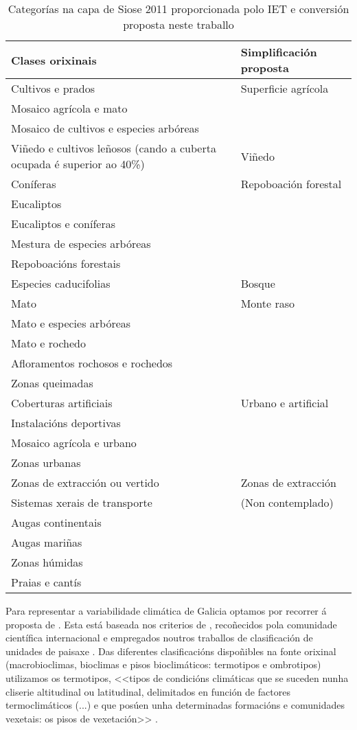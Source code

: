 \documentclass[11pt,a4paper]{article}
\begin{document}
\begin{table}
\caption{Categorías na capa de Siose 2011 proporcionada polo IET e conversión proposta neste traballo} \label{cadroSIOSE}
\begin{center}
\begin{tabular}{p{}l}
\toprule
Clases orixinais & Simplificación proposta \\
\midrule
Cultivos e prados & Superficie agrícola \\
Mosaico agrícola e mato &  \\
Mosaico de cultivos e especies arbóreas &  \\
\midrule
Viñedo e cultivos leñosos (cando a cuberta ocupada é superior ao 40\%) & Viñedo \\
\midrule
Coníferas & Repoboación forestal \\
Eucaliptos &  \\
Eucaliptos e coníferas &  \\
Mestura de especies arbóreas & \\
Repoboacións forestais &  \\
\midrule
Especies caducifolias & Bosque \\
\midrule
Mato & Monte raso\\
Mato e especies arbóreas &  \\
Mato e rochedo &  \\
Afloramentos rochosos e rochedos &  \\
Zonas queimadas &  \\
\midrule
Coberturas artificiais & Urbano e artificial \\
Instalacións deportivas &  \\
Mosaico agrícola e urbano &  \\
Zonas urbanas &  \\
\midrule
Zonas de extracción ou vertido &  Zonas de extracción\\
\midrule
Sistemas xerais de transporte &  (Non contemplado)\\
Augas continentais &  \\
Augas mariñas &  \\
Zonas húmidas &  \\
Praias e cantís &  \\
\bottomrule
\end{tabular}
\end{center}
\end{table}




Para representar a variabilidade climática de Galicia optamos por recorrer á proposta de \citet{Rodriguez2007}. Esta está baseada nos criterios de \citet{RivasMartinez2015}, recoñecidos pola comunidade científica internacional e empregados noutros traballos de clasificación de unidades de paisaxe \citep[p.ex. ][]{Capotorti2012174}. Das diferentes clasificacións dispoñibles na fonte orixinal (macrobioclimas, bioclimas e pisos bioclimáticos: termotipos e ombrotipos) utilizamos os termotipos, <<tipos de condicións climáticas que se suceden nunha cliserie altitudinal ou latitudinal, delimitados en función de factores termoclimáticos (...) e que posúen unha determinadas formacións e comunidades vexetais: os pisos de vexetación>> \citep{RivasMartinez2015}. 
\end{document}
